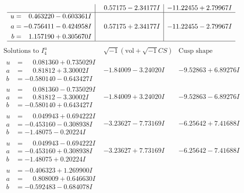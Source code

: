 \documentclass[1p]{elsarticle_modified}
\theoremstyle{definition}
\newcommand{\I}{\sqrt{-1}}
\begin{document}
$$\begin{array}{c|c|c}
 & \phantom{-}0.57175 - 2.34177 I & -11.22455 + 2.79967 I \\ \hline\begin{aligned}
u &= \phantom{-}0.463220 - 0.603361 I \\
a &= -0.756411 - 0.424958 I \\
b &= \phantom{-}1.157190 + 0.305670 I\end{aligned}
 & \phantom{-}0.57175 + 2.34177 I & -11.22455 - 2.79967 I\\
 \hline 
 \end{array}$$\newpage$$\begin{array}{c|c|c}  
\text{Solutions to }I^u_{4}& \I (\text{vol} + \sqrt{-1}CS) & \text{Cusp shape}\\
 \hline 
\begin{aligned}
u &= \phantom{-}0.081360 + 0.735029 I \\
a &= \phantom{-}0.81812 + 3.30002 I \\
b &= -0.580140 - 0.643427 I\end{aligned}
 & -1.84009 - 3.24020 I & -9.52863 + 6.89276 I \\ \hline\begin{aligned}
u &= \phantom{-}0.081360 - 0.735029 I \\
a &= \phantom{-}0.81812 - 3.30002 I \\
b &= -0.580140 + 0.643427 I\end{aligned}
 & -1.84009 + 3.24020 I & -9.52863 - 6.89276 I \\ \hline\begin{aligned}
u &= \phantom{-}0.049943 + 0.694222 I \\
a &= -0.453160 - 0.308938 I \\
b &= -1.48075 - 0.20224 I\end{aligned}
 & -3.23627 - 7.73169 I & -6.25642 + 7.41688 I \\ \hline\begin{aligned}
u &= \phantom{-}0.049943 - 0.694222 I \\
a &= -0.453160 + 0.308938 I \\
b &= -1.48075 + 0.20224 I\end{aligned}
 & -3.23627 + 7.73169 I & -6.25642 - 7.41688 I \\ \hline\begin{aligned}
u &= -0.406323 + 1.269900 I \\
a &= \phantom{-}0.808009 + 0.646630 I \\
b &= -0.592483 - 0.684078 I\end{aligned}

\end{array}$$
\end{document}
